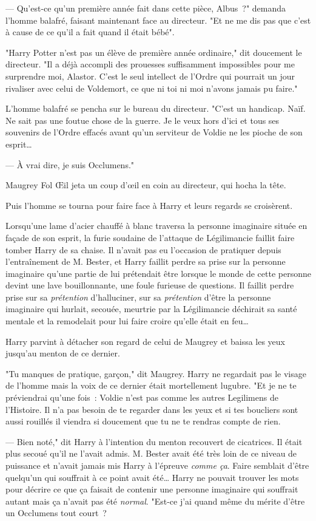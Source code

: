 --- Qu'est-ce qu'un première année fait dans cette pièce, Albus~?" demanda l'homme balafré, faisant maintenant face au directeur. "Et ne me dis pas que c'est à cause de ce qu'il a fait quand il était bébé".

"Harry Potter n'est pas un élève de première année ordinaire," dit doucement le directeur. "Il a déjà accompli des prouesses suffisamment impossibles pour me surprendre moi, Alastor. C'est le seul intellect de l'Ordre qui pourrait un jour rivaliser avec celui de Voldemort, ce que ni toi ni moi n'avons jamais pu faire."

L'homme balafré se pencha sur le bureau du directeur. "C'est un handicap. Naïf. Ne sait pas une foutue chose de la guerre. Je le veux hors d'ici et tous ses souvenirs de l'Ordre effacés avant qu'un serviteur de Voldie ne les pioche de son esprit…

--- À vrai dire, je suis Occlumens."

Maugrey Fol Œil jeta un coup d'œil en coin au directeur, qui hocha la tête.

Puis l'homme se tourna pour faire face à Harry et leurs regards se croisèrent.

Lorsqu'une lame d'acier chauffé à blanc traversa la personne imaginaire située en façade de son esprit, la furie soudaine de l'attaque de Légilimancie faillit faire tomber Harry de sa chaise. Il n'avait pas eu l'occasion de pratiquer depuis l'entraînement de M. Bester, et Harry faillit perdre sa prise sur la personne imaginaire qu'une partie de lui prétendait être lorsque le monde de cette personne devint une lave bouillonnante, une foule furieuse de questions. Il faillit perdre prise sur sa \emph{prétention} d'halluciner, sur sa \emph{prétention} d'être la personne imaginaire qui hurlait, secouée, meurtrie par la Légilimancie déchirait sa santé mentale et la remodelait pour lui faire croire qu'elle était en feu…

Harry parvint à détacher son regard de celui de Maugrey et baissa les yeux jusqu'au menton de ce dernier.

"Tu manques de pratique, garçon," dit Maugrey. Harry ne regardait pas le visage de l'homme mais la voix de ce dernier était mortellement lugubre. "Et je ne te préviendrai qu'une fois~: Voldie n'est pas comme les autres Legilimens de l'Histoire. Il n'a pas besoin de te regarder dans les yeux et si tes boucliers sont aussi rouillés il viendra si doucement que tu ne te rendras compte de rien.

--- Bien noté," dit Harry à l'intention du menton recouvert de cicatrices. Il était plus secoué qu'il ne l'avait admis. M. Bester avait été très loin de ce niveau de puissance et n'avait jamais mis Harry à l'épreuve \emph{comme ça}. Faire semblait d'être quelqu'un qui souffrait à ce point avait été… Harry ne pouvait trouver les mots pour décrire ce que ça faisait de contenir une personne imaginaire qui souffrait autant mais ça n'avait pas été \emph{normal}. "Est-ce j'ai quand même du mérite d'être un Occlumens tout court~?

